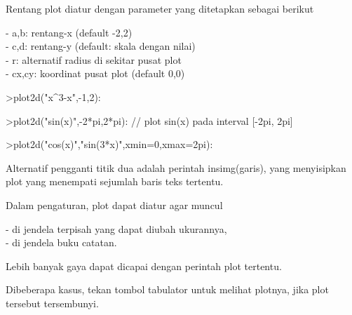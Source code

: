 \documentclass{article}
\begin{document}
\begin{eulernotebook}
\begin{eulercomment}
\begin{eulercomment}
\begin{eulercomment}
\begin{eulercomment}
\begin{eulercomment}
Rentang plot diatur dengan parameter yang ditetapkan sebagai berikut

- a,b: rentang-x (default -2,2)\\
- c,d: rentang-y (default: skala dengan nilai)\\
- r: alternatif radius di sekitar pusat plot\\
- cx,cy: koordinat pusat plot (default 0,0)
\end{eulercomment}
\begin{eulerprompt}
>plot2d("x^3-x",-1,2):
\end{eulerprompt}
\begin{eulerprompt}
>plot2d("sin(x)",-2*pi,2*pi): // plot sin(x) pada interval [-2pi, 2pi]
\end{eulerprompt}
\begin{eulerprompt}
>plot2d("cos(x)","sin(3*x)",xmin=0,xmax=2pi):
\end{eulerprompt}
\begin{eulercomment}
Alternatif pengganti titik dua adalah perintah insimg(garis), yang
menyisipkan plot yang menempati sejumlah baris teks tertentu.

Dalam pengaturan, plot dapat diatur agar muncul

- di jendela terpisah yang dapat diubah ukurannya,\\
- di jendela buku catatan.

Lebih banyak gaya dapat dicapai dengan perintah plot tertentu.

Dibeberapa kasus, tekan tombol tabulator untuk melihat plotnya, jika
plot tersebut tersembunyi.


\end{eulercomment}
\end{eulercomment}
\end{eulercomment}
\end{eulercomment}
\end{eulercomment}
\end{eulernotebook}
\end{document}
